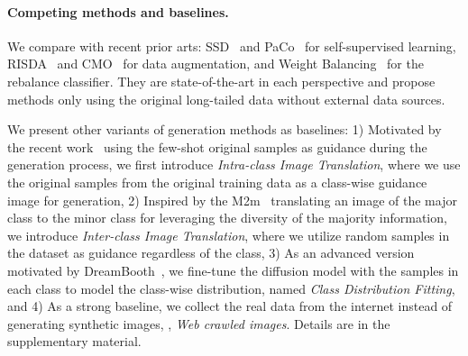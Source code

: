 \paragraph{Competing methods and baselines.}
We compare with recent prior arts: SSD~\cite{li2021self} and PaCo~\cite{cui2021parametric} for self-supervised learning, RISDA~\cite{chen2022imagine} and CMO~\cite{park2022majority} for data augmentation, and Weight Balancing~\cite{alshammari2022long} for the rebalance classifier.
They are state-of-the-art in each perspective and propose methods only using 
the original long-tailed data without external data sources.

We present other 
variants of generation methods as baselines:
1) Motivated by the recent work~\cite{he2022synthetic} using the few-shot original samples as guidance during the generation process, we first introduce
\emph{Intra-class Image Translation}, where we use the original samples from the original training data as a class-wise guidance image for generation,
2) Inspired by the M2m~\cite{kim2020m2m} translating an image of the major class to the minor class for leveraging the diversity of the majority information, we introduce
\emph{Inter-class Image Translation}, where we utilize random samples in the dataset as guidance regardless of the class,
3) As an advanced version motivated by DreamBooth~\cite{ruiz2022dreambooth}, we fine-tune the diffusion model with the samples in each class to model the class-wise distribution, named \emph{Class Distribution Fitting},
and 4) As a strong baseline, we collect the real data from the internet instead of generating synthetic images, \ie, \emph{Web crawled images}.
Details are in the supplementary material.


